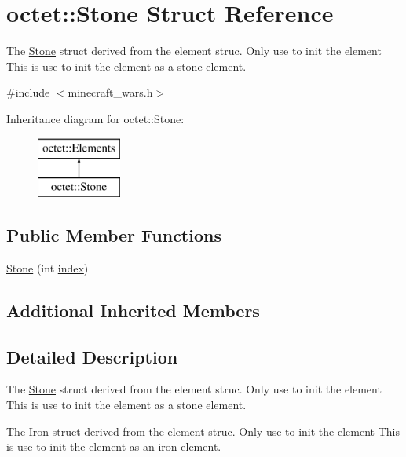 \hypertarget{structoctet_1_1_stone}{\section{octet\+:\+:Stone Struct Reference}
\label{structoctet_1_1_stone}
}


The \hyperlink{structoctet_1_1_stone}{Stone} struct derived from the element struc. Only use to init the element This is use to init the element as a stone element.  




{\ttfamily \#include $<$minecraft\+\_\+wars.\+h$>$}

Inheritance diagram for octet\+:\+:Stone\+:\begin{figure}[H]
\begin{center}
\leavevmode
\includegraphics[height=2.000000cm]{structoctet_1_1_stone}
\end{center}
\end{figure}
\subsection*{Public Member Functions}
\begin{DoxyCompactItemize}
\item 
\hyperlink{structoctet_1_1_stone_a434992c11c68d58b8e5758b584d98771}{Stone} (int \hyperlink{structoctet_1_1_elements_a8d2c5872a3c685832f767505c85cf7e3}{index})
\end{DoxyCompactItemize}
\subsection*{Additional Inherited Members}


\subsection{Detailed Description}
The \hyperlink{structoctet_1_1_stone}{Stone} struct derived from the element struc. Only use to init the element This is use to init the element as a stone element. 

The \hyperlink{structoctet_1_1_iron}{Iron} struct derived from the element struc. Only use to init the element This is use to init the element as an iron element. 

